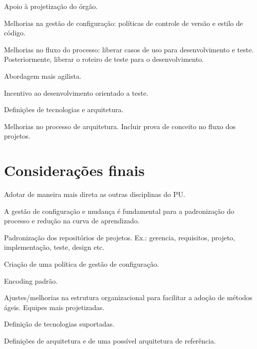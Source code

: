 \documentclass[
	article,			%
	11pt,				%
	oneside,			%
	a4paper,			%
	english,			%
	brazil,				%
	sumario=tradicional
	]{abntex2}
\begin{document}
Apoio à projetização
do órgão.

Melhorias na gestão de configuração: políticas de controle de versão e estilo de
código.

Melhorias no fluxo do processo: liberar casos de uso para desenvolvimento e
teste. Posteriormente, liberar o roteiro de teste para o desenvolvimento.

Abordagem mais agilista.

Incentivo ao desenvolvimento  orientado a teste.

Definições de tecnologias e arquitetura.

Melhorias no processo de arquitetura. Incluir prova de conceito no fluxo dos
projetos.

% 

\section*{Considerações finais}

Adotar de maneira mais direta as outras disciplinas do PU.

A gestão de configuração e mudança é fundamental para a padronização do processo
e redução na curva de aprendizado.

Padronização dos repositórios de projetos. Ex.: gerencia, requisitos, projeto,
implementação, teste, design etc.

Criação de uma política de gestão de configuração.

Encoding padrão.

Ajustes/melhorias na estrutura organizacional para facilitar a adoção de
métodos ágeis. Equipes mais projetizadas.

Definição de tecnologias suportadas.

Definições de arquitetura e de uma possível arquitetura de referência.

\postextual


\end{document}
